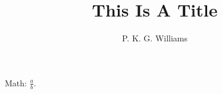 \documentclass{article}
\title{This Is A Title}
\author{P. K. G. Williams}
\begin{document}
Math: $\frac{a}{b}$.
\end{document}
